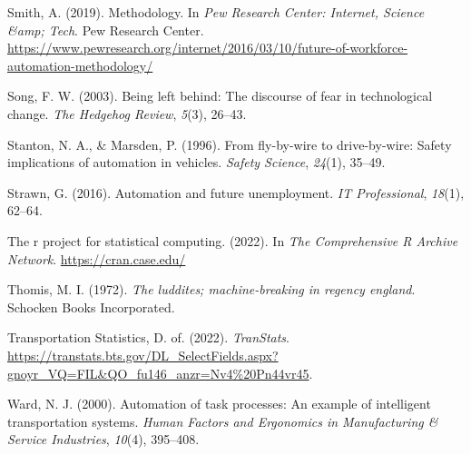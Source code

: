 \documentclass[
  man,floatsintext]{apa7}
\newlength{\cslhangindent}
\newlength{\cslentryspacingunit} %
\newenvironment{CSLReferences}[2] %
 {%
  \setlength{\parindent}{0pt}
  \ifodd #1
  \let\oldpar\par
  \def\par{\hangindent=\cslhangindent\oldpar}
  \fi
  \setlength{\parskip}{#2\cslentryspacingunit}
 }%
 {}
\begin{document}
\begin{CSLReferences}{1}{0}
\leavevmode{}%
Smith, A. (2019). Methodology. In \emph{Pew Research Center: Internet, Science \&amp; Tech}. Pew Research Center. \url{https://www.pewresearch.org/internet/2016/03/10/future-of-workforce-automation-methodology/}

\leavevmode{}%
Song, F. W. (2003). Being left behind: The discourse of fear in technological change. \emph{The Hedgehog Review}, \emph{5}(3), 26--43.

\leavevmode{}%
Stanton, N. A., \& Marsden, P. (1996). From fly-by-wire to drive-by-wire: Safety implications of automation in vehicles. \emph{Safety Science}, \emph{24}(1), 35--49.

\leavevmode{}%
Strawn, G. (2016). Automation and future unemployment. \emph{IT Professional}, \emph{18}(1), 62--64.

\leavevmode{}%
The r project for statistical computing. (2022). In \emph{The Comprehensive R Archive Network}. \url{https://cran.case.edu/}

\leavevmode{}%
Thomis, M. I. (1972). \emph{The luddites; machine-breaking in regency england}. Schocken Books Incorporated.

\leavevmode{}%
Transportation Statistics, D. of. (2022). \emph{TranStats}. \url{https://transtats.bts.gov/DL_SelectFields.aspx?gnoyr_VQ=FIL\&QO_fu146_anzr=Nv4\%20Pn44vr45}.

\leavevmode{}%
Ward, N. J. (2000). Automation of task processes: An example of intelligent transportation systems. \emph{Human Factors and Ergonomics in Manufacturing \& Service Industries}, \emph{10}(4), 395--408.

\end{CSLReferences}

\endgroup


\clearpage
\renewcommand{\listfigurename}{Figure captions}

\clearpage
\renewcommand{\listtablename}{Table captions}
\end{document}
